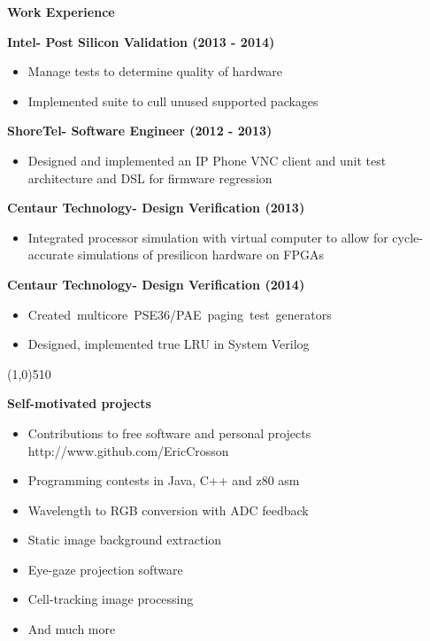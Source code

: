 \documentclass{report}
\newcommand{\cut}{\begin{center} \line(1,0){510} \end{center}}
\begin{document}
\textbf{Work Experience} \\
\begin{paracol}{2}
  \textbf{Intel- Post Silicon Validation (2013 - 2014)}
  \begin{itemize}
    \renewcommand{\labelitemi}{$\circ$}
  \item Manage tests to determine quality of hardware
  \item Implemented suite to cull unused supported packages
  \end{itemize}

  \textbf{ShoreTel- Software Engineer (2012 - 2013)}
  \begin{itemize}
    \renewcommand{\labelitemi}{$\circ$}
  \item Designed and implemented an IP Phone VNC client and unit test architecture and DSL for firmware regression
  \end{itemize}

  \switchcolumn{}
  \textbf{Centaur Technology- Design Verification (2013)}
  \begin{itemize}
    \renewcommand{\labelitemi}{$\circ$}
  \item Integrated processor simulation with virtual computer to allow
    for cycle-accurate simulations of presilicon hardware on FPGAs
  \end{itemize}

  \textbf{Centaur Technology- Design Verification (2014)}
  \begin{itemize}
    \renewcommand{\labelitemi}{$\circ$}
  \item \mbox{Created multicore PSE36/PAE paging test generators}
  \item Designed, implemented true LRU in System Verilog
  \end{itemize}
\end{paracol}

\cut{}

\textbf{Self-motivated projects}
\begin{paracol}{2}

  \begin{itemize}
    \renewcommand{\labelitemi}{$\circ$}
  \item Contributions to free software and personal projects
    http://www.github.com/EricCrosson
  \item Programming contests in Java, C++ and z80 asm
  \item Wavelength to RGB conversion with ADC feedback
  \end{itemize}

  \switchcolumn{}
  \begin{itemize}
    \renewcommand{\labelitemi}{$\circ$}
  \item Static image background extraction
  \item Eye-gaze projection software
  \item Cell-tracking image processing
  \item And much more
  \end{itemize}
\end{paracol}
\end{document}
